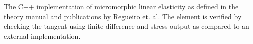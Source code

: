The C++ implementation of micromorphic linear elasticity as defined in the theory manual and publications by Regueiro et. al. The element is verified by checking the tangent using finite difference and stress output as compared to an external implementation.
